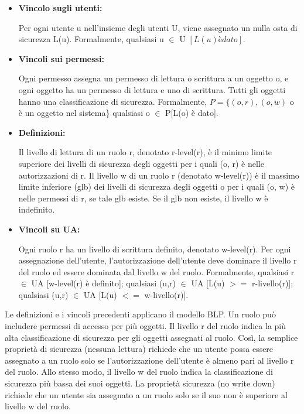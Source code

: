 \begin{itemize}
    \item \textbf{Vincolo sugli utenti:}

    Per ogni utente u nell'insieme degli utenti U, viene assegnato un nulla osta di sicurezza L(u). Formalmente, qualsiasi u $\in$ U $[L(u) è dato]$.
    
    \item \textbf{Vincoli sui permessi:}

    Ogni permesso assegna un permesso di lettura o scrittura a un oggetto o, e ogni oggetto ha un permesso di lettura e uno di scrittura. Tutti gli oggetti hanno una classificazione di sicurezza. Formalmente, $P = \{(o,r),(o,w)$ o è un oggetto nel sistema\} qualsiasi o $\in$ P[L(o) è dato].
    
    \item \textbf{Definizioni:}
    
    Il livello di lettura di un ruolo r, denotato r-level(r), è il minimo limite superiore dei livelli di sicurezza degli oggetti per i quali (o, r) è nelle autorizzazioni di r. Il livello w di un ruolo r (denotato w-level(r)) è il massimo limite inferiore (glb) dei livelli di sicurezza degli oggetti o per i quali (o, w) è nelle permessi di r, se tale glb esiste. Se il glb non esiste, il livello w è indefinito.
    
    \item \textbf{Vincoli su UA:}
    
    Ogni ruolo r ha un livello di scrittura definito, denotato w-level(r). Per ogni assegnazione dell'utente, l'autorizzazione dell'utente deve dominare il livello r del ruolo ed essere dominata dal livello w del ruolo. Formalmente, qualsiasi r $\in$ UA [w-level(r) è definito]; qualsiasi (u,r) $\in$ UA [L(u) $>=$ r-livello(r)]; qualsiasi (u,r) $\in$ UA [L(u) $<=$ w-livello(r)].
    

\end{itemize}

Le definizioni e i vincoli precedenti applicano il modello BLP. Un ruolo può includere permessi di accesso per più oggetti. Il livello r del ruolo indica la più alta classificazione di sicurezza per gli oggetti assegnati al ruolo. Così, la semplice proprietà di sicurezza (nessuna lettura) richiede che un utente possa essere assegnato a un ruolo solo se l'autorizzazione dell'utente è almeno pari al livello r del ruolo. Allo stesso modo, il livello w del ruolo indica la classificazione di sicurezza più bassa dei suoi oggetti. La proprietà sicurezza (no write down) richiede che un utente sia assegnato a un ruolo solo se il suo non è superiore al livello w del ruolo.

